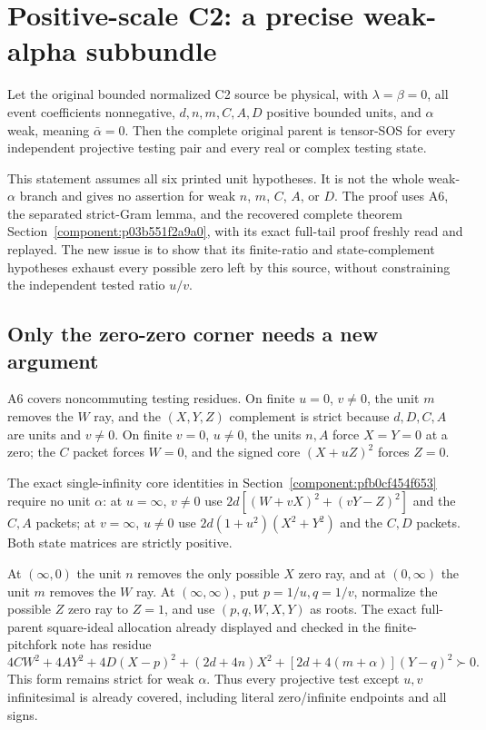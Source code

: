 \section{\texorpdfstring{Positive-scale C2: a precise weak-alpha subbundle}{Positive-scale C2: a precise weak-alpha subbundle}}
\label{component:pf31e38136e03}



\begin{theorem}
Let the original bounded normalized C2 source be physical, with
$\lambda=\beta=0$, all event coefficients nonnegative,
$d,n,m,C,A,D$ positive bounded units, and $\alpha$ weak, meaning
$\bar\alpha=0$. Then the complete original parent is tensor-SOS
for every independent projective testing pair and every real or
complex testing state.
\end{theorem}

This statement assumes all six printed unit hypotheses. It is not
the whole weak-$\alpha$ branch and gives no assertion for weak $n$,
$m$, $C$, $A$, or $D$. The proof uses A6, the separated strict-Gram
lemma, and the recovered complete theorem
Section~\ref{component:p03b551f2a9a0}, with its exact
full-tail proof freshly read and replayed. The new issue is to show
that its finite-ratio and state-complement hypotheses exhaust every
possible zero left by this source, without constraining the independent
tested ratio $u/v$.

\subsection*{Only the zero-zero corner needs a new argument}

A6 covers noncommuting testing residues. On finite $u=0$, $v\ne0$,
the unit $m$ removes the $W$ ray, and the $(X,Y,Z)$ complement is
strict because $d,D,C,A$ are units and $v\ne0$. On finite $v=0$,
$u\ne0$, the units $n,A$ force $X=Y=0$ at a zero; the $C$ packet
forces $W=0$, and the signed core $(X+uZ)^2$ forces $Z=0$.

The exact single-infinity core identities in
Section~\ref{component:pfb0cf454f653} require no unit $\alpha$: at
$u=\infty$, $v\ne0$ use
$2d[(W+vX)^2+(vY-Z)^2]$ and the $C,A$ packets; at $v=\infty$,
$u\ne0$ use $2d(1+u^2)(X^2+Y^2)$ and the $C,D$ packets.
Both state matrices are strictly positive.

At $(\infty,0)$ the unit $n$ removes the only possible $X$ zero
ray, and at $(0,\infty)$ the unit $m$ removes the $W$ ray.
At $(\infty,\infty)$, put $p=1/u,q=1/v$, normalize the possible
$Z$ zero ray to $Z=1$, and use $(p,q,W,X,Y)$ as roots. The exact
full-parent square-ideal allocation already displayed and checked in
the finite-pitchfork note has residue
\[
 4CW^2+4AY^2+4D(X-p)^2+(2d+4n)X^2
                         +[2d+4(m+\alpha)](Y-q)^2\succ0.
\]
This form remains strict for weak $\alpha$. Thus every projective
test except $u,v$ infinitesimal is already covered, including literal
zero/infinite endpoints and all signs.

